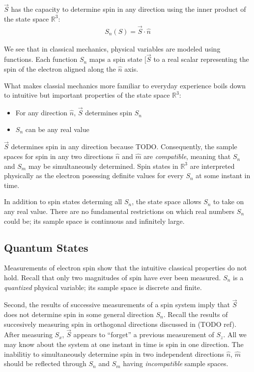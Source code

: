 $\vec{S}$ has the capacity to determine spin in any direction using the inner product of the state space $\mathbb{R}^3$:
\begin{align}
S_n(S) = \vec{S} \cdot \hat{n}
\end{align}

We see that in classical mechanics, physical variables are modeled using functions. Each function $S_n$ maps a spin state $[\vec{S}$ to a real scalar representing the spin of the electron aligned along the $\hat{n}$ axis.

What makes classial mechanics more familiar to everyday experience boils down to intuitive but important properties of the state space $\mathbb{R}^3$:
\begin{itemize}
\item For any direction $\hat{n}$, $\vec{S}$ determines spin $S_n$
\item $S_n$ can be any real value
\end{itemize}

$\vec{S}$ determines spin in any direction because TODO. Consequently, the sample spaces for spin in any two directions $\hat{n}$ and $\hat{m}$ are \textit{compatible}, meaning that $S_n$ and $S_m$ may be simultaneously determined. Spin states in $\mathbb{R}^3$ are interpreted physically as the electron posessing definite values for every $S_n$ at some instant in time.

In addition to spin states determing all $S_n$, the state space allows $S_n$ to take on any real value. There are no fundamental restrictions on which real numbers $S_n$ could be; its sample space is continuous and infinitely large.

\subsection{Quantum States}
Measurements of electron spin show that the intuitive classical properties do not hold. Recall that only two magnitudes of spin have ever been measured. $S_n$ is a \textit{quantized} physical variable; its sample space is discrete and finite.

Second, the results of successive measurements of a spin system imply that $\vec{S}$ does not determine spin in some general direction $S_n$. Recall the results of succesively measuring spin in orthogonal directions discussed in (TODO ref). After measuring $S_x$, $\vec{S}$ appears to ``forget'' a previous measurement of $S_z$. All we may know about the system at one instant in time is spin in one direction. The inabilitiy to simultaneously determine spin in two independent directions $\hat{n}$, $\hat{m}$ should be reflected through $S_n$ and $S_m$ having \textit{incompatible} sample spaces.


